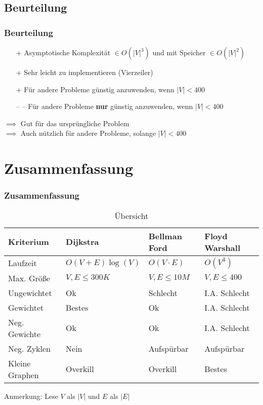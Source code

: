 
\subsection{Beurteilung} 

\begin{frame}
\frametitle{Beurteilung}
\begin{itemize}

\item[+] Asymptotische Komplexität $\in O(|V|^3)$  und mit Speicher $\in O(|V|^2)$
\item[+] Sehr leicht zu implementieren (Vierzeiler)
\item[+] Für andere Probleme günstig anzuwenden, wenn $|V|< 400$
\item[-- --] Für andere Probleme \textbf{nur} günstig anzuwenden, wenn $|V|< 400$
\end{itemize}

$\implies$ Gut für das ursprüngliche Problem\\
$\implies$ Auch nützlich für andere Probleme, solange $|V| < 400$
\end{frame}


\section{Zusammenfassung}

\begin{frame}
\frametitle{Zusammenfassung}
\small{\begin{table}
\begin{tabular}{l l l l}
\toprule
\textbf{Kriterium} & \textbf{Dijkstra} & \textbf{Bellman Ford} &\textbf{Floyd Warshall}\\
\midrule
Laufzeit & $O(V+E)\log(V)$ & $O(V \cdot E)$ & $O(V^3)$ \\
Max. Größe  & $V,E \leq 300K$ & $V,E \leq 10M$ & $V,E \leq 400$ \\
Ungewichtet & Ok & Schlecht & I.A. Schlecht \\
Gewichtet & Bestes & Ok & I.A. Schlecht \\
Neg. Gewichte & Ok & Ok & I.A. Schlecht \\
Neg. Zyklen & Nein & Aufspürbar & Aufspürbar \\
Kleine Graphen & Overkill & Overkill & Bestes \\
\bottomrule
\end{tabular}
\caption{Übersicht}
\end{table}}
Anmerkung: Lese $V$ als $|V|$ und $E$ als $|E|$
\end{frame}

